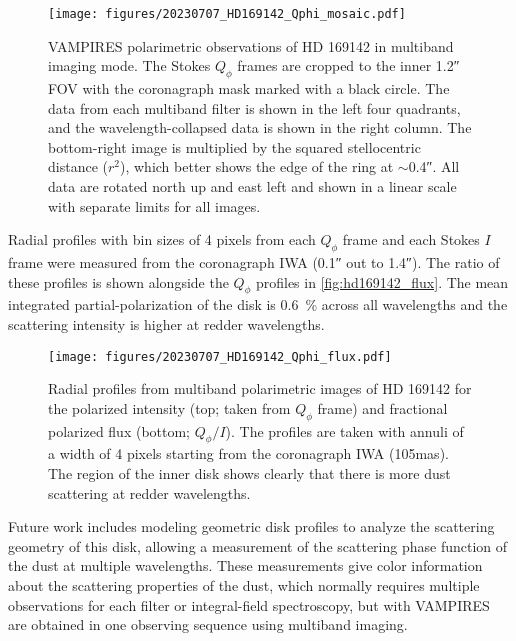 \begin{figure*}[t]
    \centering
    \texttt{[image: figures/20230707\_HD169142\_Qphi\_mosaic.pdf]}
    \caption{VAMPIRES polarimetric observations of HD 169142 in multiband imaging mode. The Stokes $Q_\phi$ frames are cropped to the inner \ang{;;1.2} FOV with the coronagraph mask marked with a black circle. The data from each multiband filter is shown in the left four quadrants, and the wavelength-collapsed data is shown in the right column. The bottom-right image is multiplied by the squared stellocentric distance ($r^2$), which better shows the edge of the ring at $\sim$\ang{;;0.4}. All data are rotated north up and east left and shown in a linear scale with separate limits for all images.\label{fig:hd169142_mosaic}}
\end{figure*}

Radial profiles with bin sizes of 4 pixels from each $Q_\phi$ frame and each Stokes $I$ frame were measured from the coronagraph IWA (\ang{;;0.1} out to \ang{;;1.4}). The ratio of these profiles is shown alongside the $Q_\phi$ profiles in \autoref{fig:hd169142_flux}. The mean integrated partial-polarization of the disk is \SI{0.6}{\%} across all wavelengths and the scattering intensity is higher at redder wavelengths. 

\begin{figure}
    \centering
    \texttt{[image: figures/20230707\_HD169142\_Qphi\_flux.pdf]}
    \caption{Radial profiles from multiband polarimetric images of HD 169142 for the polarized intensity (top; taken from $Q_\phi$ frame) and fractional polarized flux (bottom; $Q_\phi/I$). The profiles are taken with annuli of a width of 4 pixels starting from the coronagraph IWA (\si{105}{mas}). The region of the inner disk shows clearly that there is more dust scattering at redder wavelengths.\label{fig:hd169142_flux}}
\end{figure}

Future work includes modeling geometric disk profiles to analyze the scattering geometry of this disk, allowing a measurement of the scattering phase function of the dust at multiple wavelengths. These measurements give color information about the scattering properties of the dust, which normally requires multiple observations for each filter or integral-field spectroscopy, but with VAMPIRES are obtained in one observing sequence using multiband imaging.
